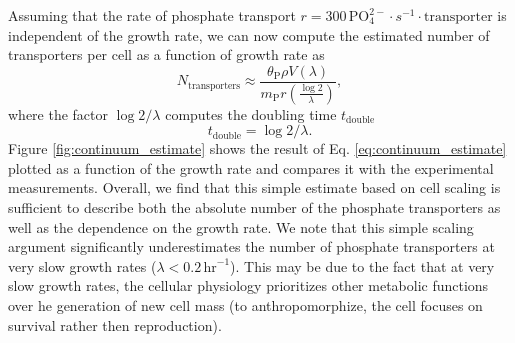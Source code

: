 \documentclass[letterpaper, 10pt]{article}
\begin{document}
Assuming that the rate of phosphate transport $r = 300\,\text{PO}_4^{2-} \cdot s^{-1} \cdot \text{transporter}$ is independent of
the growth rate, we can now compute the estimated number of transporters per
cell as a function of growth rate as 
\begin{equation}
N_\text{transporters}  \approx \frac{\theta_\text{P}\rho V(\lambda)}{m_\text{P}r\left(\frac{\log 2}{\lambda}\right)},
\label{eq:continuum_estimate}
\end{equation}
where the factor $\log{2} / \lambda$ computes the doubling time $t_\text{double}$
\begin{equation}
    t_\text{double} = \log{2} / \lambda.
\end{equation}
Figure \ref{fig:continuum_estimate} shows the result of Eq.
\ref{eq:continuum_estimate} plotted as a function of the growth rate and
compares it with the experimental measurements. Overall, we find that this
simple estimate based on cell scaling is sufficient to describe both the
absolute number of the phosphate transporters as well as the dependence on the
growth rate. We note that this simple scaling argument significantly
underestimates the number of phosphate transporters at very slow growth rates
($\lambda < 0.2\,\text{hr}^{-1}$). This may be due to the fact that at very slow
growth rates, the cellular physiology prioritizes other metabolic functions over
he generation of new cell mass (to anthropomorphize, the cell focuses on
survival rather then reproduction). 

\begin{figure}
\end{figure}
\end{document}
